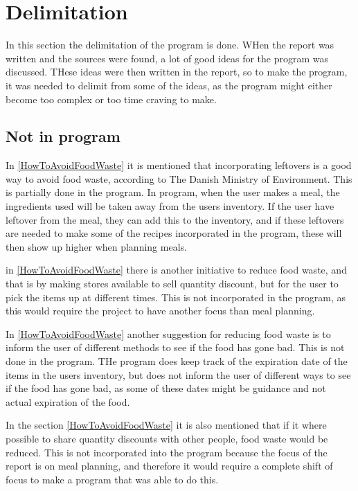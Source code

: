 \section{Delimitation}

In this section the delimitation of the program is done. WHen the report was written and the sources were found, a lot of good ideas for the program was discussed. THese ideas were then written in the report, so to make the program, it was needed to delimit from some of the ideas, as the program might either become too complex or too time craving to make.

\subsection{Not in program}

In \cref{HowToAvoidFoodWaste} it is mentioned that incorporating leftovers is a good way to avoid food waste, according to The Danish Ministry of Environment. This is partially done in the program. In program, when the user makes a meal, the ingredients used will be taken away from the users inventory. If the user have leftover from the meal, they can add this to the inventory, and if these leftovers are needed to make some of the recipes incorporated in the program, these will then show up higher when planning meals.

in \cref{HowToAvoidFoodWaste} there is another initiative to reduce food waste, and that is by making stores available to sell quantity discount, but for the user to pick the items up at different times. This is not incorporated in the program, as this would require the project to have another focus than meal planning.

In \cref{HowToAvoidFoodWaste} another suggestion for reducing food waste is to inform the user of different methods to see if the food has gone bad. This is not done in the program. THe program does keep track of the expiration date of the items in the users inventory, but does not inform the user of different ways to see if the food has gone bad, as some of these dates might be guidance and not actual expiration of the food.

In the section \ref{HowToAvoidFoodWaste} it is also mentioned that if it where possible to share quantity discounts with other people, food waste would be reduced. This is not incorporated into the program because the focus of the report is on meal planning, and therefore it would require a complete shift of focus to make a program that was able to do this.

